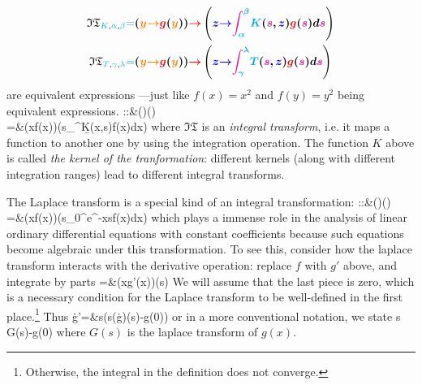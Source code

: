 {\begin{equation*}
	\begin{aligned}
\mathfrak{IT}_{\textcolor{cyan}{K},\textcolor{cyan}{\alpha},\textcolor{cyan}{\beta}}\textcolor{cyan}{=}{}&\bm{(\textcolor{orange}{y}\textcolor{orange}{\to} \textcolor{red}{g}(\textcolor{orange}{y}))\textcolor{red}{\to}\left(\textcolor{blue}{z}\textcolor{blue}{\to}\textcolor{magenta}{\int_{\textcolor{cyan}{\alpha}}^{\textcolor{cyan}{\beta}}} \textcolor{cyan}{K}(\textcolor{magenta}{s},\textcolor{blue}{z})\textcolor{red}{g}(\textcolor{magenta}{s})d\textcolor{magenta}{s}\right)}
\\
\mathfrak{IT}_{\textcolor{cyan}{T},\textcolor{cyan}{\gamma},\textcolor{cyan}{\lambda}}\textcolor{cyan}{=}{}&\bm{(\textcolor{orange}{y}\textcolor{orange}{\to} \textcolor{red}{g}(\textcolor{orange}{y})) \textcolor{red}{\to}\left(\textcolor{blue}{z}\textcolor{blue}{\to}\textcolor{magenta}{\int_{\textcolor{cyan}{\gamma}}^{\textcolor{cyan}{\lambda}}} \textcolor{cyan}{T}(\textcolor{magenta}{s},\textcolor{blue}{z})\textcolor{red}{g}(\textcolor{magenta}{s})d\textcolor{magenta}{s}\right)}
	\end{aligned}
\end{equation*}
are equivalent expressions ---just like \mbox{$f(x)=x^2$} and \mbox{$f(y)=y^2$} being equivalent expressions.
}
::{}&(\C\to\C)\to (\C\to\C)\\
={}&(x\to f(x))\to\left(s\to\int\limits_\a^\b K(x,s)f(x)dx\right)
\eea 
where $\mathfrak{IT}$ is an \emph{integral transform}, i.e. it maps a function to another one by using the integration operation. The function $K$ above is called \emph{the kernel of the tranformation}: different kernels (along with different integration ranges) lead to different integral transforms.

The Laplace transform is a special kind of an integral transformation:
\cL::{}&(\C\to\C)\to (\C\to\C)\\
\cL={}&(x\to f(x))\to\left(s\to\int\limits_0^\infty e^{-xs}f(x)dx\right)
\eea 
which plays a immense role in the analysis of linear ordinary differential equations with constant coefficients because such equations become algebraic under this transformation. To see this, consider how the laplace transform interacts with the derivative operation: replace $f$ with $g'$ above, and integrate by parts
\be 
\cL={}&(x\to g'(x))\to\left(s\to {}\right)
\ee 
We will assume that the last piece is zero, which is a necessary condition for the Laplace transform to be well-defined in the first place.\footnote{Otherwise, the integral in the definition does not converge.} Thus
\be 
\cL\.g'={}&s\to \left(s(\cL\.g)(s)-g(0)\right)
\ee 
or in a more conventional notation, we state
\be 
{} s G(s)-g(0)
\ee 
where $G(s)$ is the laplace transform of $g(x)$.

